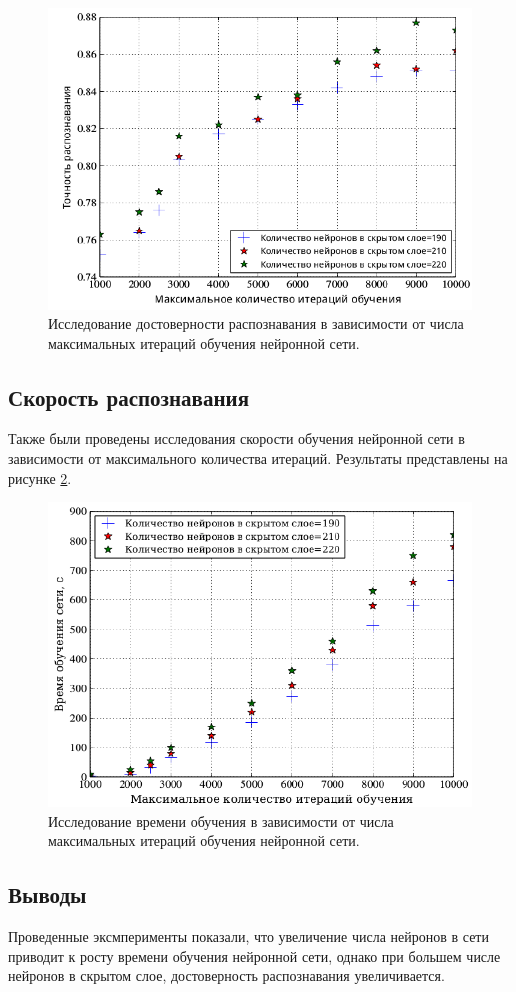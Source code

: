 \begin{figure}[h!]
  \centering
    \captionsetup{justification=centering}
  \includegraphics[width=.8\textwidth]{acc_from_iter.png}
  \caption{Исследование достоверности распознавания в зависимости от числа
максимальных итераций обучения нейронной сети.}
  \label{fig:acc}
\end{figure}

\subsection{Скорость распознавания}

Также были проведены исследования скорости обучения нейронной сети
в зависимости от максимального количества итераций. Результаты представлены на
рисунке \ref{fig:time}.

\begin{figure}[h!]
  \centering
    \captionsetup{justification=centering}
  \includegraphics[width=.8\textwidth]{time_from_iter.png}
  \caption{Исследование времени обучения в зависимости от числа максимальных 
итераций обучения нейронной сети.}
  \label{fig:time}
\end{figure}

\subsection*{Выводы}

Проведенные эксмперименты показали, что увеличение числа нейронов в сети
приводит к росту времени обучения нейронной сети, однако при большем числе нейронов в скрытом
слое, достоверность распознавания увеличивается.

\clearpage
